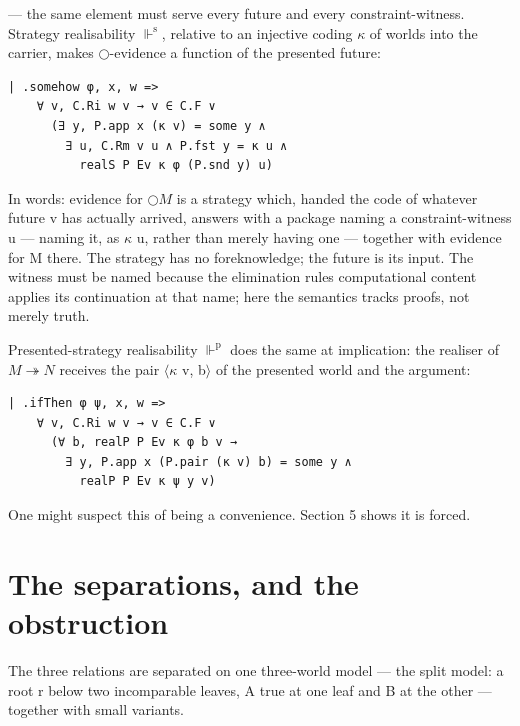 --- the same element must serve every future and every
constraint-witness. Strategy realisability \ensuremath{\Vdash^{\mathrm{s}}}, relative to an injective
coding \ensuremath{\kappa} of worlds into the carrier, makes \ensuremath{\bigcirc}-evidence a function of the
presented future:

\begin{lstlisting}
| .somehow φ, x, w =>
    ∀ v, C.Ri w v → v ∈ C.F ∨
      (∃ y, P.app x (κ v) = some y ∧
        ∃ u, C.Rm v u ∧ P.fst y = κ u ∧
          realS P Ev κ φ (P.snd y) u)
\end{lstlisting}

In words: evidence for \ensuremath{\bigcirc M} is a strategy which, handed the code of
whatever future v has actually arrived, answers with a package naming a
constraint-witness u --- naming it, as \ensuremath{\kappa} u, rather than merely having
one --- together with evidence for M there. The strategy has no
foreknowledge; the future is its input. The witness must be named
because the elimination rule\textquotesingle s computational content applies its
continuation at that name; here the semantics tracks proofs, not merely
truth.

Presented-strategy realisability \ensuremath{\Vdash^{\mathrm{p}}} does the same at
implication: the realiser of \ensuremath{M \twoheadrightarrow N} receives the pair \ensuremath{\langle\kappa} v, b\ensuremath{\rangle} of the
presented world and the argument:

\begin{lstlisting}
| .ifThen φ ψ, x, w =>
    ∀ v, C.Ri w v → v ∈ C.F ∨
      (∀ b, realP P Ev κ φ b v →
        ∃ y, P.app x (P.pair (κ v) b) = some y ∧
          realP P Ev κ ψ y v)
\end{lstlisting}

One might suspect this of being a convenience. Section 5 shows it is
forced.

\section{The separations, and the obstruction}\label{5-the-separations-and-the-obstruction}

The three relations are separated on one three-world model --- the split
model: a root r below two incomparable leaves, A true at one leaf and B
at the other --- together with small variants.

